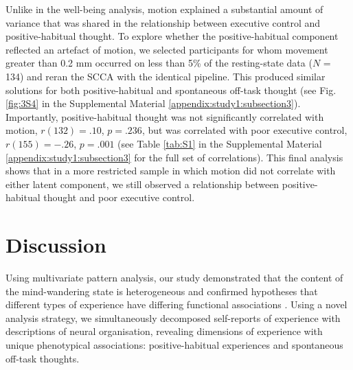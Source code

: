Unlike in the well-being analysis, motion explained a substantial amount of variance that was shared in the relationship between executive control and positive-habitual thought. To explore whether the positive-habitual component reflected an artefact of motion, we selected participants for whom movement greater than 0.2 mm occurred on less than 5\% of the resting-state data (\(\mathit{N}\) = 134) and reran the SCCA with the identical pipeline. This produced similar solutions for both positive-habitual and spontaneous off-task thought (see Fig.\ref{fig:3S4} in the Supplemental Material \ref{appendix:study1:subsection3}). Importantly, positive-habitual thought was not significantly correlated with motion, 
\(\mathit{r}(132) = .10\), 
\(\mathit{p} = .236\), 
but was correlated with poor executive control,
\(\mathit{r}(155) = -.26\), 
\(\mathit{p} = .001\) 
(see Table \ref{tab:S1} in the Supplemental Material \ref{appendix:study1:subsection3} for the full set of correlations). 
This final analysis shows that in a more restricted sample in which motion did not correlate with either latent component, we still observed a relationship between positive-habitual thought and poor executive control.

\section{Discussion}
\label{study1:discussion}
Using multivariate pattern analysis, our study demonstrated that the content of the mind-wandering state is heterogeneous and confirmed hypotheses that different types of experience have differing functional associations \cite{SmallwoodCC2013}. 
Using a novel analysis strategy, we simultaneously decomposed self-reports of experience with descriptions of neural organisation, revealing dimensions of experience with unique phenotypical associations: positive-habitual experiences and spontaneous off-task thoughts.

